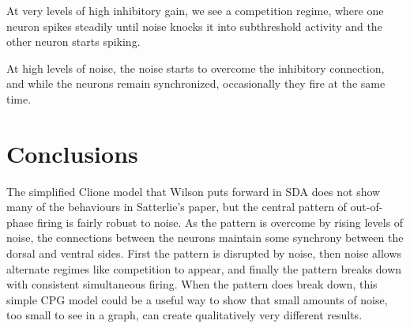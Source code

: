 \documentclass{article}
\begin{document}
At very levels of high inhibitory gain, we see a competition regime, where one neuron spikes steadily
until noise knocks it into subthreshold activity and the other neuron starts spiking.\\
\scalebox{0.6}{}

At high levels of noise, the noise starts to overcome the inhibitory connection, and while the 
neurons remain synchronized, occasionally they fire at the same time.\\
\scalebox{0.6}{}
\section*{Conclusions}
The simplified Clione model that Wilson puts forward in SDA does not show many of the behaviours in
Satterlie's paper, but the central pattern of out-of-phase firing is fairly robust to noise.
As the pattern is overcome by rising levels of noise, the connections between the neurons
maintain some synchrony between the dorsal and ventral sides.  First the pattern is disrupted by noise,
then noise allows alternate regimes like competition to appear, and finally the pattern breaks down
with consistent simultaneous firing.  When the pattern does break down,
this simple CPG model could be a useful way to show that small amounts of noise, too small to see in
a graph, can create qualitatively very different results.
\end{document}

